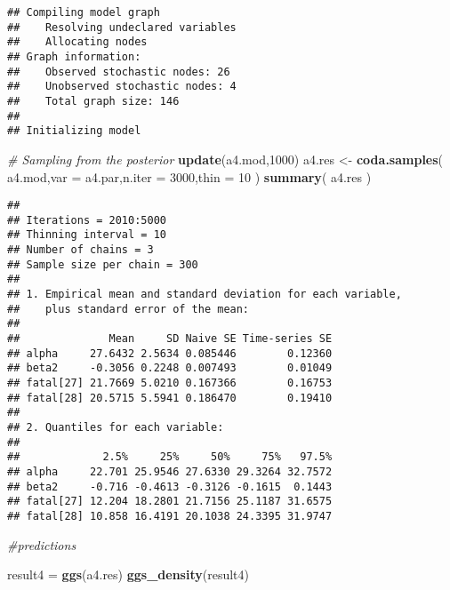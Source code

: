 \documentclass[]{article}
\newenvironment{Shaded}{\begin{snugshade}}{\end{snugshade}}
\newcommand{\KeywordTok}[1]{\textcolor[rgb]{0.13,0.29,0.53}{\textbf{#1}}}
\newcommand{\DataTypeTok}[1]{\textcolor[rgb]{0.13,0.29,0.53}{#1}}
\newcommand{\DecValTok}[1]{\textcolor[rgb]{0.00,0.00,0.81}{#1}}
\newcommand{\StringTok}[1]{\textcolor[rgb]{0.31,0.60,0.02}{#1}}
\newcommand{\CommentTok}[1]{\textcolor[rgb]{0.56,0.35,0.01}{\textit{#1}}}
\newcommand{\NormalTok}[1]{#1}
\begin{document}
\begin{verbatim}
## Compiling model graph
##    Resolving undeclared variables
##    Allocating nodes
## Graph information:
##    Observed stochastic nodes: 26
##    Unobserved stochastic nodes: 4
##    Total graph size: 146
## 
## Initializing model
\end{verbatim}

\begin{Shaded}
\begin{Highlighting}[]
 \CommentTok{# Sampling from the posterior}
 \KeywordTok{update}\NormalTok{(a4.mod,}\DecValTok{1000}\NormalTok{)}
\NormalTok{ a4.res <-}\StringTok{ }\KeywordTok{coda.samples}\NormalTok{( a4.mod,}\DataTypeTok{var =}\NormalTok{ a4.par,}\DataTypeTok{n.iter =} \DecValTok{3000}\NormalTok{,}\DataTypeTok{thin =} \DecValTok{10}\NormalTok{ )}
 \KeywordTok{summary}\NormalTok{( a4.res )}
\end{Highlighting}
\end{Shaded}

\begin{verbatim}
## 
## Iterations = 2010:5000
## Thinning interval = 10 
## Number of chains = 3 
## Sample size per chain = 300 
## 
## 1. Empirical mean and standard deviation for each variable,
##    plus standard error of the mean:
## 
##              Mean     SD Naive SE Time-series SE
## alpha     27.6432 2.5634 0.085446        0.12360
## beta2     -0.3056 0.2248 0.007493        0.01049
## fatal[27] 21.7669 5.0210 0.167366        0.16753
## fatal[28] 20.5715 5.5941 0.186470        0.19410
## 
## 2. Quantiles for each variable:
## 
##             2.5%     25%     50%     75%   97.5%
## alpha     22.701 25.9546 27.6330 29.3264 32.7572
## beta2     -0.716 -0.4613 -0.3126 -0.1615  0.1443
## fatal[27] 12.204 18.2801 21.7156 25.1187 31.6575
## fatal[28] 10.858 16.4191 20.1038 24.3395 31.9747
\end{verbatim}

\begin{Shaded}
\begin{Highlighting}[]
 \CommentTok{#predictions}
\end{Highlighting}
\end{Shaded}

\begin{Shaded}
\begin{Highlighting}[]
\NormalTok{result4 =}\StringTok{ }\KeywordTok{ggs}\NormalTok{(a4.res)}
\KeywordTok{ggs_density}\NormalTok{(result4)}
\end{Highlighting}
\end{Shaded}
\end{document}
